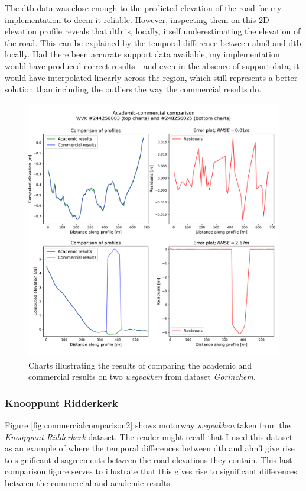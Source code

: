 The \ac{dtb} data was close enough to the predicted elevation of the road for my implementation to deem it reliable. However, inspecting them on this 2D elevation profile reveals that \ac{dtb} is, locally, itself underestimating the elevation of the road. This can be explained by the temporal difference between \ac{ahn3} and \ac{dtb} locally. Had there been accurate support data available, my implementation would have produced correct results - and even in the absence of support data, it would have interpolated linearly across the region, which still represents a better solution than including the outliers the way the commercial results do.

\begin{figure}
    \centering
    \includegraphics[width=0.9\linewidth]{final_report/figs/commercialcomparison1.pdf}
    \caption{Charts illustrating the results of comparing the academic and commercial results on two \textit{wegvakken} from dataset \textit{Gorinchem}.}
    \label{fig:commercialcomparison1}
\end{figure}

\subsubsection{Knooppunt Ridderkerk}

Figure \ref{fig:commercialcomparison2} shows motorway \textit{wegvakken} taken from the \textit{Knooppunt Ridderkerk} dataset. The reader might recall that I used this dataset as an example of where the temporal differences between \ac{dtb} and \ac{ahn3} give rise to significant disagreements between the road elevations they contain. This last comparison figure serves to illustrate that this gives rise to significant differences between the commercial and academic results.

